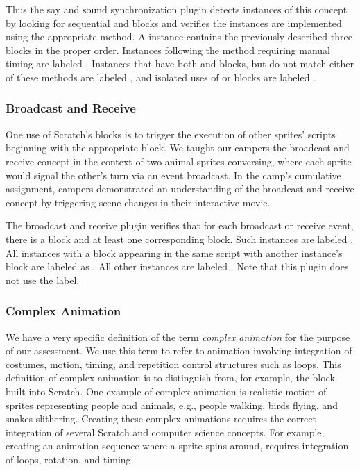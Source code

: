 Thus the say and sound synchronization plugin detects instances of this concept
by looking for sequential \say{} and \playsound{} blocks and verifies the
instances are implemented using the appropriate method.  A \correct{} instance
contains the previously described three blocks in the proper order.  Instances
following the method requiring manual timing are labeled \semincor{}. Instances
that have both \say{} and \playsound{} blocks, but do not match either of these
methods are labeled \incor{}, and isolated uses of \say{} or \playsound{}
blocks are labeled \incom{}.


\subsubsection{Broadcast and Receive}
One use of Scratch's \broadcast{} blocks is to trigger the execution of other
sprites' scripts beginning with the appropriate \receive{} block. We taught our
campers the broadcast and receive concept in the context of two animal sprites
conversing, where each sprite would signal the other's turn via an event
broadcast. In the camp's cumulative assignment, campers demonstrated an
understanding of the broadcast and receive concept by triggering scene changes
in their interactive movie.

The broadcast and receive plugin verifies that for each broadcast or receive
event, there is a \broadcast{} block and at least one corresponding \receive{}
block. Such instances are labeled \correct{}. All instances with a \broadcast{}
block appearing in the same script with another instance's \broadcast{} block
are labeled as \semincor{}. All other instances are labeled \incom{}. Note that
this plugin does not use the \incor{} label.

\subsubsection{Complex Animation}
We have a very specific definition of the term \emph{complex animation} for the
purpose of our assessment.  We use this term to refer to animation involving
integration of costumes, motion, timing, and repetition control structures such
as loops. This definition of complex animation is to distinguish from, for
example, the \glideto{} block built into Scratch.  One example of complex
animation is realistic motion of sprites representing people and animals, e.g.,
people walking, birds flying, and snakes slithering.  Creating these complex
animations requires the correct integration of several Scratch and computer
science concepts.  For example, creating an animation sequence where a sprite
spins around, requires integration of loops, rotation, and timing.

